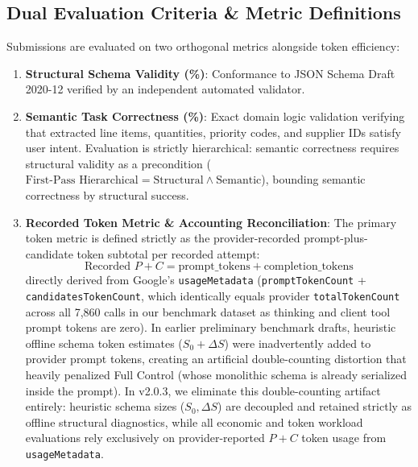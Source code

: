 \subsection{Dual Evaluation Criteria \& Metric Definitions}
Submissions are evaluated on two orthogonal metrics alongside token efficiency:
\begin{enumerate}
    \item \textbf{Structural Schema Validity (\%)}: Conformance to JSON Schema Draft 2020-12 verified by an independent automated validator.
    \item \textbf{Semantic Task Correctness (\%)}: Exact domain logic validation verifying that extracted line items, quantities, priority codes, and supplier IDs satisfy user intent. Evaluation is strictly hierarchical: semantic correctness requires structural validity as a precondition ($\text{First-Pass Hierarchical} = \text{Structural} \land \text{Semantic}$), bounding semantic correctness by structural success.
    \item \textbf{Recorded Token Metric \& Accounting Reconciliation}: The primary token metric is defined strictly as the provider-recorded prompt-plus-candidate token subtotal per recorded attempt:
    \begin{equation}
    \text{Recorded } P+C = \text{prompt\_tokens} + \text{completion\_tokens}
    \end{equation}
    directly derived from Google's \texttt{usageMetadata} (\texttt{promptTokenCount} + \texttt{candidatesTokenCount}, which identically equals provider \texttt{totalTokenCount} across all 7,860 calls in our benchmark dataset as thinking and client tool prompt tokens are zero). In earlier preliminary benchmark drafts, heuristic offline schema token estimates ($S_0 + \Delta S$) were inadvertently added to provider prompt tokens, creating an artificial double-counting distortion that heavily penalized Full Control (whose monolithic schema is already serialized inside the prompt). In v2.0.3, we eliminate this double-counting artifact entirely: heuristic schema sizes ($S_0, \Delta S$) are decoupled and retained strictly as offline structural diagnostics, while all economic and token workload evaluations rely exclusively on provider-reported $P+C$ token usage from \texttt{usageMetadata}.
\end{enumerate}

